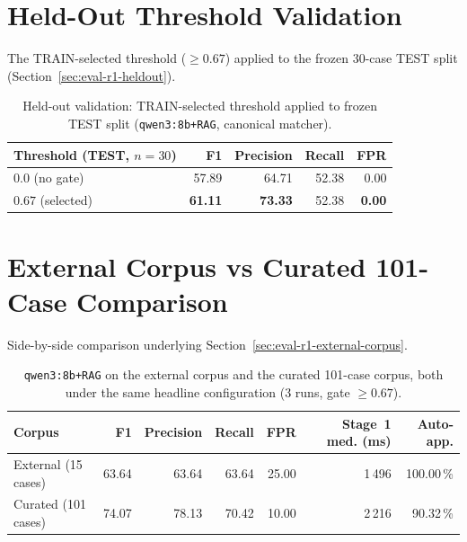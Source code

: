 \section{Held-Out Threshold Validation}
\label{app:r1-heldout}

The TRAIN-selected threshold ($\geq 0.67$) applied to the frozen 30-case TEST split (Section~\ref{sec:eval-r1-heldout}).

\begin{table}[H]
\centering
\caption[Held-out validation: TRAIN threshold on frozen TEST split.]{Held-out validation: TRAIN-selected threshold applied to frozen TEST split (\texttt{qwen3:8b+RAG}, canonical matcher).}
\label{tab:r1-heldout-app}
\footnotesize
\begin{tabular}{@{}lrrrr@{}}
\toprule
\textbf{Threshold (TEST, $n=30$)} & \textbf{F1} & \textbf{Precision} & \textbf{Recall} & \textbf{FPR} \\
\midrule
$0.0$ (no gate)         & 57.89 & 64.71 & 52.38 & 0.00 \\
$0.67$ (selected)       & \textbf{61.11} & \textbf{73.33} & 52.38 & \textbf{0.00} \\
\bottomrule
\end{tabular}
\end{table}

\section{External Corpus vs Curated 101-Case Comparison}
\label{app:r1-external-corpus}

Side-by-side comparison underlying Section~\ref{sec:eval-r1-external-corpus}.

\begin{table}[H]
\centering
\caption[Headline configuration on external corpus vs. curated 101-case corpus.]{\texttt{qwen3:8b+RAG} on the external corpus and the curated 101-case corpus, both under the same headline configuration (3 runs, gate $\geq 0.67$).}
\label{tab:r1-external-corpus-app}
\footnotesize
\begin{tabular}{@{}lrrrrrr@{}}
\toprule
\textbf{Corpus} & \textbf{F1} & \textbf{Precision} & \textbf{Recall} & \textbf{FPR} & \textbf{Stage~1 med. (ms)} & \textbf{Auto-app.} \\
\midrule
External (15 cases)         & 63.64 & 63.64 & 63.64 & 25.00 & 1\,496 & 100.00\,\% \\
Curated (101 cases)         & 74.07 & 78.13 & 70.42 & 10.00 & 2\,216 & 90.32\,\% \\
\bottomrule
\end{tabular}
\end{table}

